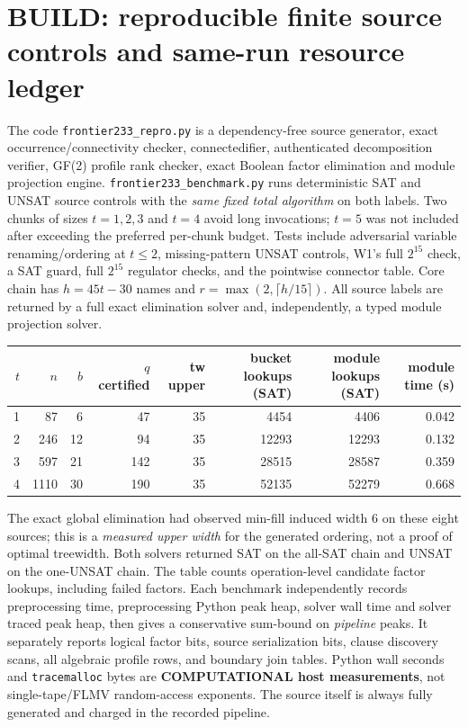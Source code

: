\documentclass[10pt]{article}
\begin{document}
\section{BUILD: reproducible finite source controls and same-run resource ledger}
The code \texttt{frontier233\_repro.py} is a dependency-free source generator, exact occurrence/connectivity checker, connectedifier, authenticated decomposition verifier, GF(2) profile rank checker, exact Boolean factor elimination and module projection engine. \texttt{frontier233\_benchmark.py} runs deterministic SAT and UNSAT source controls with the \emph{same fixed total algorithm} on both labels. Two chunks of sizes $t=1,2,3$ and $t=4$ avoid long invocations; $t=5$ was not included after exceeding the preferred per-chunk budget. Tests include adversarial variable renaming/ordering at $t\le2$, missing-pattern UNSAT controls, W1's full $2^{15}$ check, a SAT guard, full $2^{15}$ regulator checks, and the pointwise connector table. Core chain has $h=45t-30$ names and $r=\max(2,\lceil h/15\rceil)$. All source labels are returned by a full exact elimination solver and, independently, a typed module projection solver.
\begin{center}\small\begin{tabular}{rrrrrrrr}
\toprule
$t$&$n$&$b$&$q$ certified&tw upper&bucket lookups (SAT)&module lookups (SAT)&module time (s)\\\midrule
1&87&6&47&35&4454&4406&0.042\\
2&246&12&94&35&12293&12293&0.132\\
3&597&21&142&35&28515&28587&0.359\\
4&1110&30&190&35&52135&52279&0.668\\\bottomrule
\end{tabular}\end{center}
\noindent The exact global elimination had observed min-fill induced width 6 on these eight sources; this is a \emph{measured upper width} for the generated ordering, not a proof of optimal treewidth. Both solvers returned SAT on the all-SAT chain and UNSAT on the one-UNSAT chain. The table counts operation-level candidate factor lookups, including failed factors. Each benchmark independently records preprocessing time, preprocessing Python peak heap, solver wall time and solver traced peak heap, then gives a conservative sum-bound on \emph{pipeline} peaks. It separately reports logical factor bits, source serialization bits, clause discovery scans, all algebraic profile rows, and boundary join tables. Python wall seconds and \texttt{tracemalloc} bytes are \textbf{COMPUTATIONAL host measurements}, not single-tape/FLMV random-access exponents. The source itself is always fully generated and charged in the recorded pipeline.
\end{document}
